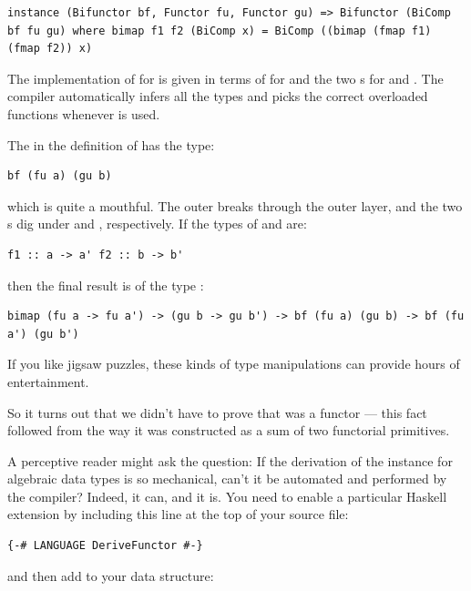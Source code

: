 \begin{verbatim}
instance (Bifunctor bf, Functor fu, Functor gu) => Bifunctor (BiComp bf fu gu) where bimap f1 f2 (BiComp x) = BiComp ((bimap (fmap f1) (fmap f2)) x) 
\end{verbatim}

The implementation of  for  is given in
terms of  for  and the two s for
 and . The compiler automatically infers all the
types and picks the correct overloaded functions whenever
 is used.

The  in the definition of  has the type:

\begin{verbatim}
bf (fu a) (gu b)
\end{verbatim}

which is quite a mouthful. The outer  breaks through the
outer  layer, and the two s dig under
 and , respectively. If the types of 
and  are:

\begin{verbatim}
f1 :: a -> a' f2 :: b -> b'
\end{verbatim}

then the final result is of the type
:

\begin{verbatim}
bimap (fu a -> fu a') -> (gu b -> gu b') -> bf (fu a) (gu b) -> bf (fu a') (gu b')
\end{verbatim}

If you like jigsaw puzzles, these kinds of type manipulations can
provide hours of entertainment.

So it turns out that we didn't have to prove that  was a
functor --- this fact followed from the way it was constructed as a sum
of two functorial primitives.

A perceptive reader might ask the question: If the derivation of the
 instance for algebraic data types is so mechanical,
can't it be automated and performed by the compiler? Indeed, it can, and
it is. You need to enable a particular Haskell extension by including
this line at the top of your source file:

\begin{verbatim}
{-# LANGUAGE DeriveFunctor #-}
\end{verbatim}

and then add  to your data structure:

